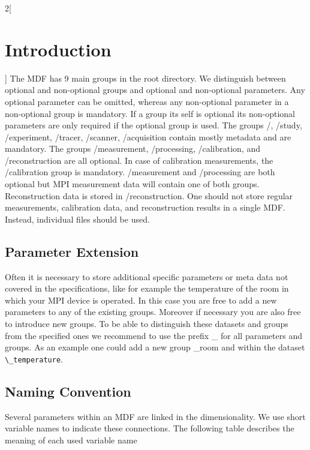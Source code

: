\documentclass[landscape,a4paper]{article} %
\newcommand{\inl}[1]{\lstinline[columns=fixed]{#1}}
\newcommand{\inlvar}[1]{{\ttfamily#1}}
\begin{document}
\begin{multicols}{2}[\section{Introduction} \label{Sec:Introduction}]
The MDF has 9 main groups in the root directory. We distinguish between optional and non-optional groups and optional and non-optional parameters. Any optional parameter can be omitted, whereas any non-optional parameter in a non-optional group is mandatory. If a group its self is optional its non-optional parameters are only required if the optional group is used. The groups \inlvar{/}, \inlvar{/study}, \inlvar{/experiment}, \inlvar{/tracer}, \inlvar{/scanner}, \inlvar{/acquisition} contain mostly metadata and are mandatory. The groups \inlvar{/measurement}, \inlvar{/processing}, \inlvar{/calibration}, and \inlvar{/reconstruction} are all optional. In case of calibration measurements, the \inlvar{/calibration} group is mandatory. \inlvar{/measurement} and \inlvar{/processing} are both optional but MPI measurement data will contain one of both groups. Reconstruction data is stored in \inlvar{/reconstruction}. One should not store regular measurements, calibration data, and reconstruction results in a single MDF. Instead, individual files should be used.

\subsection{Parameter Extension}

Often it is necessary to store additional specific parameters or meta data not covered in the specifications, like for example the temperature of the room in which your MPI device is operated. In this case you are free to add a new parameters to any of the existing groups. Moreover if necessary you are also free to introduce new groups. To be able to distinguish these datasets and groups from the specified ones we recommend to use the prefix \inlvar{\_} for all parameters and groups. As an example one could add a new group \inlvar{\_room} and within the dataset \inl{\_temperature}.

\subsection{Naming Convention}

Several parameters within an MDF are linked in the dimensionality. We use short variable names to indicate these connections. The following table describes the meaning of each used variable name



\end{multicols}
\end{document}
